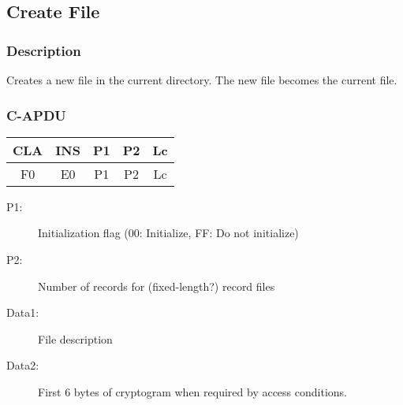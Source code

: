 \documentclass[a4paper,oneside]{article}
\begin{document}

\subsection{Create File}

\subsubsection*{Description}

Creates a new file in the current directory. The new file becomes
the current file.

\subsubsection*{C-APDU}

\begin{tabular}{|c|c|c|c|c|} \hline
CLA & INS & P1 & P2 & Lc \\ \hline \hline
F0 & E0 & P1 & P2 & Lc \\ \hline
\end{tabular}

\begin{description}
\item[P1:] Initialization flag (00: Initialize, FF: Do not initialize)
\item[P2:] Number of records for (fixed-length?) record files
\item[Data1:] File description
\item[Data2:] First 6 bytes of cryptogram when required by access conditions.
\end{description}
\end{document}
